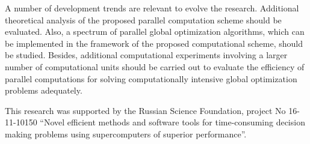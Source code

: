 \documentclass[
11pt,%
tightenlines,%
twoside,%
onecolumn,%
nofloats,%
nobibnotes,%
nofootinbib,%
superscriptaddress,%
noshowpacs,%
centertags]%
{revtex4}
\begin{document}
A number of development trends are relevant to evolve the research. Additional theoretical analysis of the proposed parallel computation scheme should be evaluated. Also, a spectrum of parallel global optimization algorithms, which can be implemented in the framework of the proposed computational scheme, should be studied. Besides, additional computational experiments involving a larger number of computational units should be carried out to evaluate the efficiency of parallel computations for solving computationally intensive global optimization problems adequately.


\begin{acknowledgments}
This research was supported by the Russian Science Foundation, project No 16-11-10150 ``Novel efficient methods and software tools for time-consuming decision making problems using supercomputers of superior performance''.
\end{acknowledgments}
\end{document}
